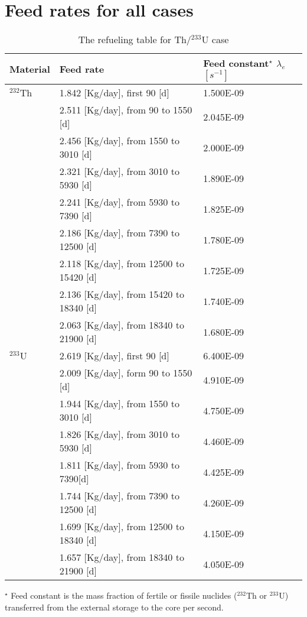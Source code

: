 \section{Feed rates for all cases}
\setcounter{table}{0}  
\begin{table}[ht!]
	\centering
	\caption{The refueling table for Th/$^{233}$U case} 
	\vspace{1ex}
	\begin{tabularx}{\textwidth}{|p{1.5cm}|b|p{2.9cm}|}
		\hline
		\textbf{Material} & \textbf{Feed rate} & \textbf{Feed 
		constant$^{\star}$} $\lambda_{e}$ $[s^{-1}]$ \\
		\hline
 $^{232}$Th        &  1.842 [Kg/day], first 90 [d] & 1.500E-09 \\
	&  2.511 [Kg/day], from 90 to 1550 [d] & 		2.045E-09 \\
	&  2.456 [Kg/day], from 1550 to 3010 [d] & 		2.000E-09 \\
	&  2.321 [Kg/day], from 3010 to 5930 [d]& 		1.890E-09	\\
	&  2.241 [Kg/day], from 5930 to 7390 [d] &		1.825E-09	\\
	&  2.186 [Kg/day], from 7390 to 12500 [d] &		1.780E-09	\\
	&  2.118 [Kg/day], from 12500 to 15420 [d] &	1.725E-09	\\
	&  2.136 [Kg/day], from 15420 to 18340 [d]&		1.740E-09		\\
	&  2.063 [Kg/day], from 18340 to 21900 [d]&		1.680E-09	 \\ 
 \hline
$^{233}$U & 2.619 [Kg/day], first 90 [d]	&   6.400E-09  \\
	& 2.009 [Kg/day],  form 90 to 1550 [d] &	4.910E-09 \\
	& 1.944 [Kg/day], from 1550 to 3010 [d] &	4.750E-09 \\
	& 1.826 [Kg/day],  from 3010 to 5930 [d] &	4.460E-09 \\
	& 1.811 [Kg/day],  from 5930 to 7390[d] &	4.425E-09 \\
	& 1.744 [Kg/day], from 7390 to 12500 [d] &	4.260E-09 \\
	& 1.699 [Kg/day], from 12500 to 18340 [d]	& 4.150E-09 \\
	& 1.657 [Kg/day], from 18340 to 21900 [d]	& 4.050E-09 \\
\hline
\end{tabularx}
\begin{tablenotes}
	\small
	\item  $^{\star}$ Feed constant is the mass fraction of fertile or fissile nuclides ($^{232}$Th or $^{233}$U) transferred from the external storage to the core per second.
\end{tablenotes}
\label{tab:table8}
\end{table}	
